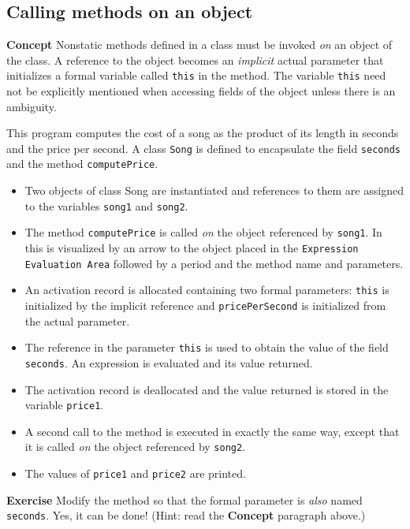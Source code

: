 \subsection{Calling methods on an object}\label{method.05}

\textbf{Concept} Nonstatic methods defined in a class must be invoked
\emph{on} an object of the class. A reference to the object becomes
an \emph{implicit} actual parameter that initializes a formal variable called
\texttt{this} in the method. The variable \texttt{this} need not be 
explicitly mentioned when accessing fields of the object unless there is an ambiguity.


This program computes the cost of a song as the product of its length
in seconds and the price per second. A class \texttt{Song} is defined
to encapsulate the field \texttt{seconds} and the method \texttt{computePrice}.

\begin{itemize}
\item Two objects of class Song are instantiated and references to them
are assigned to the variables \texttt{song1} and \texttt{song2}.
\item The method \texttt{computePrice} is called \emph{on} the object referenced by \texttt{song1}. In \jel{} this is visualized by an arrow to the object
placed in the \texttt{Expression Evaluation Area} followed by a period and
the method name and parameters.
\item An activation record is allocated containing two formal parameters:
\texttt{this} is initialized by the implicit reference and \texttt{pricePerSecond}
is initialized from the actual parameter.
\item The reference in the parameter \texttt{this} is used to obtain 
the value of the field \texttt{seconds}. An expression is evaluated and
its value returned.
\item The activation record is deallocated and the value returned is stored in the variable \texttt{price1}.
\item A second call to the method is executed in exactly the same way,
except that it is called \emph{on} the object referenced by \texttt{song2}.
\item The values of \texttt{price1} and \texttt{price2} are printed.
\end{itemize}

\textbf{Exercise} Modify the method so that the formal parameter is \emph{also} 
named \texttt{seconds}. Yes, it can be done! 
(Hint: read the \textbf{Concept} paragraph above.)
